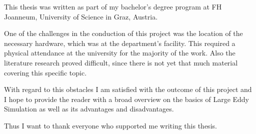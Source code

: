 This thesis was written as part of my bachelor's degree program at FH Joanneum, University of Science in Graz, Austria.

One of the challenges in the conduction of this project was the location of the necessary hardware, which was at the department's facility. This required a physical attendance at the university for the majority of the work. Also the literature research proved difficult, since there is not yet that much material covering this specific topic.

With regard to this obstacles I am satisfied with the outcome of this project and I hope to provide the reader with a broad overview on the basics of Large Eddy Simulation as well as its advantages and disadvantages.

Thus I want to thank everyone who supported me writing this thesis.